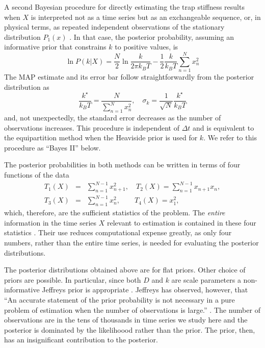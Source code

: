 \documentclass[english,aps, onecolumn, prl,superscriptaddress, notitlepage]{revtex4-1}
\begin{document}
A second Bayesian procedure for directly estimating the trap stiffness
results when $X$ is interpreted not as a time series but as an exchangeable
sequence, or, in physical terms, as repeated independent observations
of the stationary distribution $P_{1}(x)$ \cite{jaynes2003probability}.
In that case, the posterior probability, assuming an informative prior
that constrains $k$ to positive values, is
\begin{equation}
\ln P(k|X)=\frac{N}{2}\ln\frac{k}{2\pi k_{B}T}-\frac{1}{2}\frac{k}{k_{B}T}\sum_{n=1}^{N}x_{n}^{2}\label{eq:k-posterior}
\end{equation}
The MAP estimate and its error bar follow straightforwardly from the
posterior distribution as
\begin{equation}
\frac{k^{\star}}{k_{B}T}=\frac{N}{\sum_{n=1}^{N}x_{n}^{2}},\quad\sigma_{k}=\frac{1}{\sqrt{N}}\frac{k^{\star}}{k_{B}T}\label{eq:k-map}
\end{equation}
and, not unexpectedly, the standard error decreases as the number
of observations increases. This procedure is independent of $\Delta t$
and is equivalent to the equipartition method when the Heaviside prior
is used for $k$. We refer to this procedure as ``Bayes II'' below.

The posterior probabilities in both methods can be written in terms
of four functions of the data
\begin{eqnarray}
T_{1}(X) & = & \sum_{n=1}^{N-1}x_{n+1}^{2},\quad T_{2}(X)=\sum_{n=1}^{N-1}x_{n+1}x_{n},\nonumber \\
T_{3}(X) & = & \sum_{n=1}^{N-1}x_{n}^{2},\qquad T_{4}(X)=x_{1}^{2},
\end{eqnarray}
which, therefore, are the sufficient statistics of the problem. The
\emph{entire} information in the time series $X$ relevant to estimation
is contained in these four statistics \cite{jaynes2003probability}.
Their use reduces computational expense greatly, as only four numbers,
rather than the entire time series, is needed for evaluating the posterior
distributions.

The posterior distributions obtained above are for flat priors. Other
choice of priors are possible. In particular, since both $D$ and
$k$ are scale parameters a non-informative Jeffreys prior is appropriate
\cite{jeffreys1998theory}. Jeffreys has observed, however, that ``An
accurate statement of the prior probability is not necessary in a
pure problem of estimation when the number of observations is large.''
\cite{jeffreys1998theory}. The number of observations are in the
tens of thousands in time series we study here and the posterior is
dominated by the likelihoood rather than the prior. The prior, then,
has an insignificant contribution to the posterior. 
\end{document}
